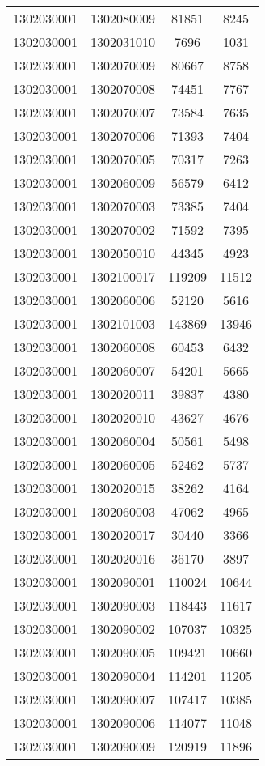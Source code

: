 \begin{longtable}{llcc}
1302030001 & 1302080009 & 81851 & 8245\\
1302030001 & 1302031010 & 7696 & 1031\\
1302030001 & 1302070009 & 80667 & 8758\\
1302030001 & 1302070008 & 74451 & 7767\\
1302030001 & 1302070007 & 73584 & 7635\\
1302030001 & 1302070006 & 71393 & 7404\\
1302030001 & 1302070005 & 70317 & 7263\\
1302030001 & 1302060009 & 56579 & 6412\\
1302030001 & 1302070003 & 73385 & 7404\\
1302030001 & 1302070002 & 71592 & 7395\\
1302030001 & 1302050010 & 44345 & 4923\\
1302030001 & 1302100017 & 119209 & 11512\\
1302030001 & 1302060006 & 52120 & 5616\\
1302030001 & 1302101003 & 143869 & 13946\\
1302030001 & 1302060008 & 60453 & 6432\\
1302030001 & 1302060007 & 54201 & 5665\\
1302030001 & 1302020011 & 39837 & 4380\\
1302030001 & 1302020010 & 43627 & 4676\\
1302030001 & 1302060004 & 50561 & 5498\\
1302030001 & 1302060005 & 52462 & 5737\\
1302030001 & 1302020015 & 38262 & 4164\\
1302030001 & 1302060003 & 47062 & 4965\\
1302030001 & 1302020017 & 30440 & 3366\\
1302030001 & 1302020016 & 36170 & 3897\\
1302030001 & 1302090001 & 110024 & 10644\\
1302030001 & 1302090003 & 118443 & 11617\\
1302030001 & 1302090002 & 107037 & 10325\\
1302030001 & 1302090005 & 109421 & 10660\\
1302030001 & 1302090004 & 114201 & 11205\\
1302030001 & 1302090007 & 107417 & 10385\\
1302030001 & 1302090006 & 114077 & 11048\\
1302030001 & 1302090009 & 120919 & 11896\\

\end{longtable}
